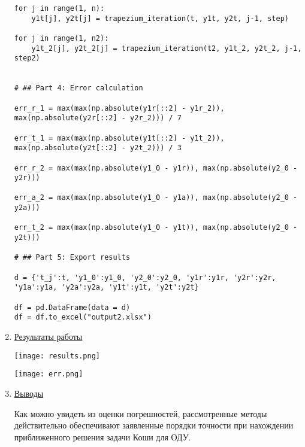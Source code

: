 \documentclass{article}%
\begin{document}
\begin{enumerate}
\begin{verbatim}
for j in range(1, n):
    y1t[j], y2t[j] = trapezium_iteration(t, y1t, y2t, j-1, step)
    
for j in range(1, n2):
    y1t_2[j], y2t_2[j] = trapezium_iteration(t2, y1t_2, y2t_2, j-1, step2)


# ## Part 4: Error calculation

err_r_1 = max(max(np.absolute(y1r[::2] - y1r_2)), max(np.absolute(y2r[::2] - y2r_2))) / 7

err_t_1 = max(max(np.absolute(y1t[::2] - y1t_2)), max(np.absolute(y2t[::2] - y2t_2))) / 3

err_r_2 = max(max(np.absolute(y1_0 - y1r)), max(np.absolute(y2_0 - y2r)))

err_a_2 = max(max(np.absolute(y1_0 - y1a)), max(np.absolute(y2_0 - y2a)))

err_t_2 = max(max(np.absolute(y1_0 - y1t)), max(np.absolute(y2_0 - y2t)))

# ## Part 5: Export results

d = {'t_j':t, 'y1_0':y1_0, 'y2_0':y2_0, 'y1r':y1r, 'y2r':y2r, 'y1a':y1a, 'y2a':y2a, 'y1t':y1t, 'y2t':y2t}

df = pd.DataFrame(data = d)
df = df.to_excel("output2.xlsx")
\end{verbatim}

\item%
\underline{Результаты работы}

\texttt{[image: results.png]}

\vskip 0.2in

\texttt{[image: err.png]}

\vskip 0.2in

\item%
\underline{Выводы}

Как можно увидеть из оценки погрешностей, рассмотренные методы действительно обеспечивают заявленные порядки точности при нахождении приближенного решения задачи Коши для ОДУ.
\end{enumerate}%
\end{document}
